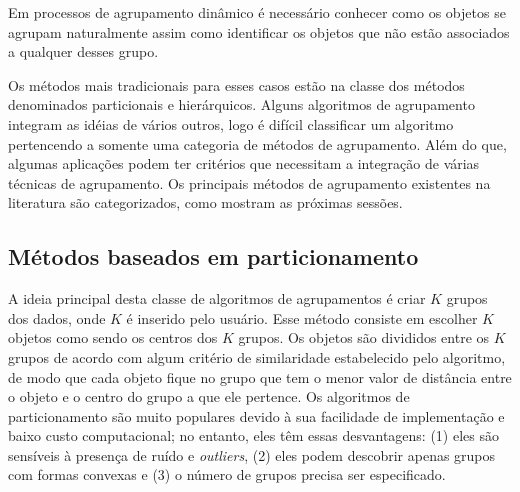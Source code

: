 Em processos de agrupamento dinâmico é necessário conhecer como os objetos se agrupam naturalmente assim como identificar os objetos que não estão associados a qualquer desses grupo.

Os métodos mais tradicionais para esses casos estão na classe dos métodos denominados particionais e hierárquicos. Alguns algoritmos de agrupamento integram as idéias de vários outros, logo é difícil classificar um algoritmo pertencendo a somente uma categoria de métodos de agrupamento. Além do que, algumas aplicações podem ter critérios que necessitam a integração de várias técnicas de agrupamento. Os principais métodos de agrupamento existentes na literatura são categorizados, como mostram as próximas sessões.

\subsection{Métodos baseados em particionamento}
A ideia principal desta classe de algoritmos de agrupamentos é criar ${K}$ grupos dos dados, onde ${K}$ é inserido pelo usuário.
Esse método consiste em escolher ${K}$ objetos como sendo os centros dos ${K}$ grupos.
Os objetos são divididos entre os ${K}$ grupos de acordo com algum critério de similaridade
estabelecido pelo algoritmo, de modo que cada objeto fique no grupo que tem o menor valor de
distância entre o objeto e o centro do grupo a que ele pertence.
Os algoritmos de particionamento são muito populares devido à sua facilidade de implementação e baixo custo computacional; no entanto, eles têm essas desvantagens: (1) eles são sensíveis à presença de ruído e \textit{outliers}, (2) eles podem descobrir apenas grupos com formas convexas e (3) o número de grupos precisa ser especificado.


